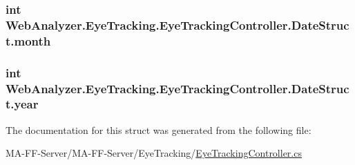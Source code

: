 \subsubsection[{month}]{\setlength{\rightskip}{0pt plus 5cm}int Web\+Analyzer.\+Eye\+Tracking.\+Eye\+Tracking\+Controller.\+Date\+Struct.\+month}\label{struct_web_analyzer_1_1_eye_tracking_1_1_eye_tracking_controller_1_1_date_struct_a56a535cacf3097374d4aaa047bb5613f}
\hypertarget{struct_web_analyzer_1_1_eye_tracking_1_1_eye_tracking_controller_1_1_date_struct_a94165834519ba2ed3da89d083a456b11}{}
\subsubsection[{year}]{\setlength{\rightskip}{0pt plus 5cm}int Web\+Analyzer.\+Eye\+Tracking.\+Eye\+Tracking\+Controller.\+Date\+Struct.\+year}\label{struct_web_analyzer_1_1_eye_tracking_1_1_eye_tracking_controller_1_1_date_struct_a94165834519ba2ed3da89d083a456b11}


The documentation for this struct was generated from the following file\+:\begin{DoxyCompactItemize}
\item 
M\+A-\/\+F\+F-\/\+Server/\+M\+A-\/\+F\+F-\/\+Server/\+Eye\+Tracking/\hyperlink{_eye_tracking_controller_8cs}{Eye\+Tracking\+Controller.\+cs}\end{DoxyCompactItemize}
